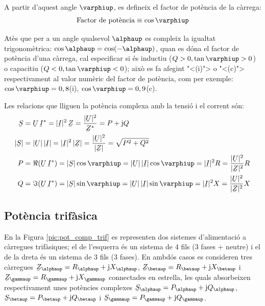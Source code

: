 A partir d'aquest angle $\varphiup$, es
defineix el factor de pot\`{e}ncia de la c\`{a}rrega:
\begin{equation}
   \text{Factor de pot\`{e}ncia} \equiv \cos\varphiup
\end{equation}

At\`{e}s que per a un angle qualsevol $\alphaup$ es compleix la igualtat
trigonom\`{e}trica: $\cos\alphaup = \cos(-\alphaup)$, quan es d\'{o}na el factor
de pot\`{e}ncia d'una c\`{a}rrega, cal especificar si \'{e}s inductiu ($Q>0,
\tan\varphiup>0$) o capacitiu ($Q<0, \tan\varphiup<0$); aix\`{o} es fa
afegint {"<}(i){">} o {"<}(c){">} respectivament al valor num\`{e}ric del factor
de pot\`{e}ncia, com per exemple: $\cos\varphiup=0,8$(i),
$\cos\varphiup=0,9$(c).

Les relacions que lliguen la pot\`{e}ncia complexa amb la tensi\'{o} i el corrent s\'{o}n:
\begin{align}
   \cmplx{S} &=  \cmplx{U} \,\cmplx{I}^* =
   |\cmplx{I}|^2 \,\cmplx{Z} = \frac{|\cmplx{U}|^2}{\cmplx{Z}^*} =
   P + \ju Q \label{eq:s_mono1}\\
   |\cmplx{S}| &= |\cmplx{U}| \,|\cmplx{I}| =
   |\cmplx{I}|^2 \,|\cmplx{Z}| = \frac{|\cmplx{U}|^2}{|\cmplx{Z}|} =
   \sqrt{P^2+Q^2} \\
   P &= \Re (\cmplx{U} \, \cmplx{I}^*) = |\cmplx{S}| \cos\varphiup =
   |\cmplx{U}|\, |\cmplx{I}| \cos\varphiup = |\cmplx{I}|^2 R =
   \frac{|\cmplx{U}|^2}{|\cmplx{Z}|^2}R\\
   Q &= \Im (\cmplx{U} \, \cmplx{I}^*) = |\cmplx{S}| \sin\varphiup =
   |\cmplx{U}| \,|\cmplx{I}|\sin\varphiup  = |\cmplx{I}|^2 X =
   \frac{|\cmplx{U}|^2}{|\cmplx{Z}|^2}X
\end{align}

\subsection{Pot\`{e}ncia trif\`{a}sica} 

En la Figura \vref{pic:pot_comp_trif} es representen dos sistemes
d'alimentaci\'{o} a c\`{a}rregues trif\`{a}siques; el de l'esquerra \'{e}s un
sistema de 4 fils (3 fases + neutre) i el de la dreta \'{e}s un sistema
de 3 fils (3 fases). En ambd\'{o}s casos es consideren tres c\`{a}rregues
$\cmplx{Z}_\alphaup = R_\alphaup + \ju X_\alphaup$, $\cmplx{Z}_\betaup=
R_\betaup + \ju X_\betaup$ i $\cmplx{Z}_\gammaup= R_\gammaup + \ju X_\gammaup$
connectades en estrella, les quals absorbeixen respectivament unes
pot\`{e}ncies complexes $\cmplx{S}_\alphaup= P_\alphaup + \ju Q_\alphaup$,
$\cmplx{S}_\betaup= P_\betaup + \ju Q_\betaup$ i $\cmplx{S}_\gammaup=
P_\gammaup + \ju Q_\gammaup$.

